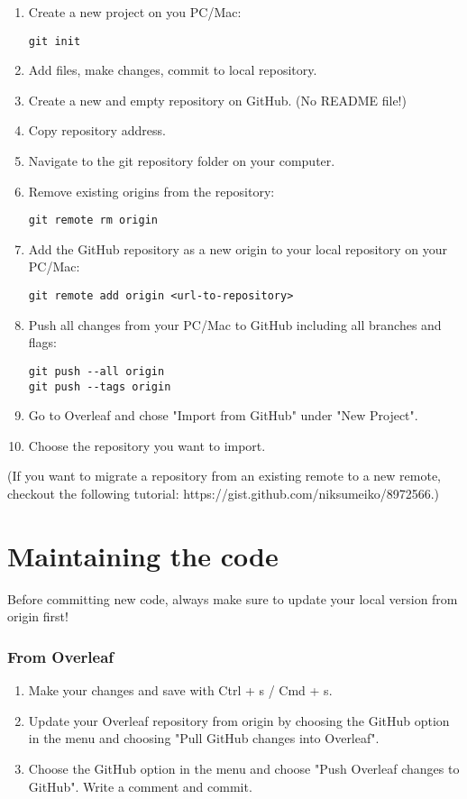 \documentclass{article}
\begin{document}
\begin{enumerate}
    \item Create a new project on you PC/Mac:
    \begin{verbatim}
git init
    \end{verbatim}
    \item Add files, make changes, commit to local repository.
    \item Create a new and empty repository on GitHub. (No README file!)
    \item Copy repository address.
    \item Navigate to the git repository folder on your computer.
    \item Remove existing origins from the repository:
    \begin{verbatim}
git remote rm origin
    \end{verbatim}
    \item Add the GitHub repository as a new origin to your local repository on your PC/Mac:
    \begin{verbatim}
git remote add origin <url-to-repository>
    \end{verbatim}
    \item Push all changes from your PC/Mac to GitHub including all branches and flags:
    \begin{verbatim}
git push --all origin
git push --tags origin
    \end{verbatim}
    \item Go to Overleaf and chose "Import from GitHub" under "New Project".
    \item Choose the repository you want to import.
\end{enumerate}

(If you want to migrate a repository from an existing remote to a new remote, checkout the following tutorial: https://gist.github.com/niksumeiko/8972566.)

\section{Maintaining the code}

Before committing new code, always make sure to update your local version from origin first!

\subsubsection{From Overleaf}

\begin{enumerate}
    \item Make your changes and save with Ctrl + s / Cmd + s.
    \item Update your Overleaf repository from origin by choosing the GitHub option in the menu and choosing "Pull GitHub changes into Overleaf".
    \item Choose the GitHub option in the menu and choose "Push Overleaf changes to GitHub". Write a comment and commit.
\end{enumerate}
\end{document}

